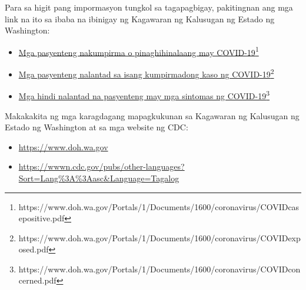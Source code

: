 \documentclass[10pt]{article}
\newcommand{\link}[2]{\href{#1}{#2}\footnote{#1}}
\begin{document}
Para sa higit pang impormasyon tungkol sa tagapagbigay, pakitingnan ang mga link
na ito sa ibaba na ibinigay ng Kagawaran ng Kalusugan ng Estado ng Washington:

\begin{itemize}
\item

  \link{https://www.doh.wa.gov/Portals/1/Documents/1600/coronavirus/COVIDcasepositive.pdf}{Mga
  pasyenteng nakumpirma o pinaghihinalaang may COVID-19}

\item

  \link{https://www.doh.wa.gov/Portals/1/Documents/1600/coronavirus/COVIDexposed.pdf}{Mga
  pasyenteng nalantad sa isang kumpirmadong kaso ng COVID-19}

\item

  \link{https://www.doh.wa.gov/Portals/1/Documents/1600/coronavirus/COVIDconcerned.pdf}{Mga
  hindi nalantad na pasyenteng may mga sintomas ng COVID-19}

\end{itemize}

Makakakita ng mga karagdagang mapagkukunan sa Kagawaran ng Kalusugan ng Estado
ng Washington at sa mga website ng CDC:

\begin{itemize}
\item

  \url{https://www.doh.wa.gov}

\item

  \url{https://wwwn.cdc.gov/pubs/other-languages?Sort=Lang%3A%3Aasc&Language=Tagalog}

\end{itemize}
\end{document}
